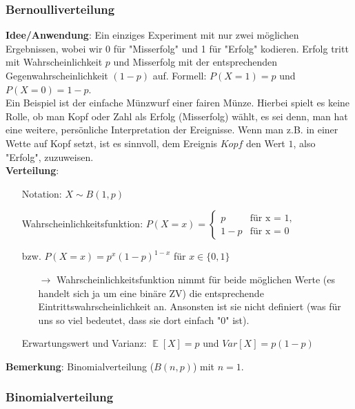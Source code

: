 \documentclass[a4paper]{article}
\DeclareMathOperator*{\E}{\mathbb{E}}
\begin{document}
\subsubsection{Bernoulliverteilung} \label{sec:Ber}

\noindent \textbf{Idee/Anwendung}:  Ein einziges Experiment mit nur zwei möglichen Ergebnissen, wobei wir 0 für "Misserfolg" und 1 für "Erfolg" kodieren. Erfolg tritt mit Wahrscheinlichkeit $p$ und Misserfolg mit der entsprechenden Gegenwahrscheinlichkeit $(1-p)$ auf. Formell: $P(X=1)=p$ und $P(X=0)=1-p$. \\

\noindent Ein Beispiel ist der einfache Münzwurf einer fairen Münze. Hierbei spielt es keine Rolle, ob man Kopf oder Zahl als Erfolg (Misserfolg) wählt, es sei denn, man hat eine weitere, persönliche Interpretation der Ereignisse. Wenn man z.B. in einer Wette auf Kopf setzt, ist es sinnvoll, dem Ereignis $Kopf$ den Wert $1$, also "Erfolg", zuzuweisen. \\

\noindent \textbf{Verteilung}: 
\begin{itemize}
\item[] Notation: $X\sim B(1,p)$
\item[] Wahrscheinlichkeitsfunktion: $P(X=x) = \begin{cases}
			p & \text{für x = 1,}\\
            1-p & \text{für x = 0}
		 \end{cases}$ 
\item[] \hspace{4.5cm} bzw. $P(X=x)=p^x(1-p)^{1-x}$ für $x \in \{0,1\}$
	\begin{itemize}
	\item[$\rightarrow$] Wahrscheinlichkeitsfunktion nimmt für beide möglichen Werte (es handelt sich ja um eine binäre ZV) die entsprechende Eintrittswahrscheinlichkeit an. Ansonsten ist sie nicht definiert (was für uns so viel bedeutet, dass sie dort einfach "0" ist).
	\end{itemize}
\item[] Erwartungswert und Varianz: $\E[X]=p$ und $Var[X]=p(1-p)$

\end{itemize}
\noindent \textbf{Bemerkung}: Binomialverteilung ($B(n,p)$) mit $n=1$.

\subsubsection{Binomialverteilung} \label{sec:Bin}
\end{document}
